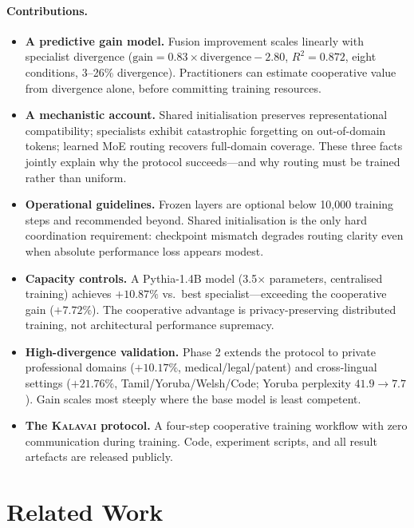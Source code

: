 \documentclass{article}
\newcommand{\kalavai}{\textsc{Kalavai}\xspace}
\begin{document}
\paragraph{Contributions.}
\begin{itemize}[leftmargin=*, itemsep=2pt]
  \item \textbf{A predictive gain model.} Fusion improvement scales linearly with specialist divergence ($\text{gain} = 0.83 \times \text{divergence} - 2.80$, $R^2 = 0.872$, eight conditions, 3--26\% divergence). Practitioners can estimate cooperative value from divergence alone, before committing training resources.
  \item \textbf{A mechanistic account.} Shared initialisation preserves representational compatibility; specialists exhibit catastrophic forgetting on out-of-domain tokens; learned MoE routing recovers full-domain coverage. These three facts jointly explain why the protocol succeeds---and why routing must be trained rather than uniform.
  \item \textbf{Operational guidelines.} Frozen layers are optional below 10,000 training steps and recommended beyond. Shared initialisation is the only hard coordination requirement: checkpoint mismatch degrades routing clarity even when absolute performance loss appears modest.
  \item \textbf{Capacity controls.} A Pythia-1.4B model (3.5$\times$ parameters, centralised training) achieves $+10.87\%$ vs.\ best specialist---exceeding the cooperative gain ($+7.72\%$). The cooperative advantage is privacy-preserving distributed training, not architectural performance supremacy.
  \item \textbf{High-divergence validation.} Phase 2 extends the protocol to private professional domains ($+10.17\%$, medical/legal/patent) and cross-lingual settings ($+21.76\%$, Tamil/Yoruba/Welsh/Code; Yoruba perplexity $41.9\to7.7$). Gain scales most steeply where the base model is least competent.
  \item \textbf{The \kalavai protocol.} A four-step cooperative training workflow with zero communication during training. Code, experiment scripts, and all result artefacts are released publicly.
\end{itemize}

\section{Related Work}
\label{sec:related}
\end{document}
